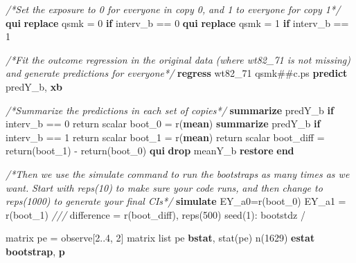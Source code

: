 \documentclass[
  10pt,
]{book}
\newenvironment{Shaded}{\begin{snugshade}}{\end{snugshade}}
\newcommand{\CommentTok}[1]{\textcolor[rgb]{0.56,0.35,0.01}{\textit{#1}}}
\newcommand{\DecValTok}[1]{\textcolor[rgb]{0.00,0.00,0.81}{#1}}
\newcommand{\FunctionTok}[1]{\textcolor[rgb]{0.00,0.00,0.00}{#1}}
\newcommand{\KeywordTok}[1]{\textcolor[rgb]{0.13,0.29,0.53}{\textbf{#1}}}
\newcommand{\NormalTok}[1]{#1}
\newcommand{\OtherTok}[1]{\textcolor[rgb]{0.56,0.35,0.01}{#1}}
\begin{document}
\begin{Shaded}
\begin{Highlighting}[]
\CommentTok{/*Set the exposure to 0 for everyone in copy 0, }
\CommentTok{and 1 to everyone for copy 1*/}
\KeywordTok{qui} \KeywordTok{replace}\NormalTok{ qsmk = 0 }\KeywordTok{if}\NormalTok{ interv\_b == 0}
\KeywordTok{qui} \KeywordTok{replace}\NormalTok{ qsmk = 1 }\KeywordTok{if}\NormalTok{ interv\_b == 1}

\CommentTok{/*Fit the outcome regression in the original data }
\CommentTok{(where wt82\_71 is not missing) and }
\CommentTok{generate predictions for everyone*/}
\KeywordTok{regress}\NormalTok{ wt82\_71 qsmk\#\#c.ps}
\KeywordTok{predict}\NormalTok{ predY\_b, }\KeywordTok{xb}

\CommentTok{/*Summarize the predictions in each set of copies*/}
\KeywordTok{summarize}\NormalTok{ predY\_b }\KeywordTok{if}\NormalTok{ interv\_b == 0}
\FunctionTok{return} \FunctionTok{scalar}\NormalTok{ boot\_0 = }\FunctionTok{r}\NormalTok{(}\KeywordTok{mean}\NormalTok{)}
\KeywordTok{summarize}\NormalTok{ predY\_b }\KeywordTok{if}\NormalTok{ interv\_b == 1}
\FunctionTok{return} \FunctionTok{scalar}\NormalTok{ boot\_1 = }\FunctionTok{r}\NormalTok{(}\KeywordTok{mean}\NormalTok{)}
\FunctionTok{return} \FunctionTok{scalar}\NormalTok{ boot\_diff = }\FunctionTok{return}\NormalTok{(boot\_1) {-} }\FunctionTok{return}\NormalTok{(boot\_0)}
\KeywordTok{qui} \KeywordTok{drop}\NormalTok{ meanY\_b}
\KeywordTok{restore}
\KeywordTok{end}

\CommentTok{/*Then we use the \textasciigrave{}simulate\textasciigrave{} command to run the bootstraps }
\CommentTok{as many times as we want.}
\CommentTok{Start with reps(10) to make sure your code runs, }
\CommentTok{and then change to reps(1000) to generate your final CIs*/}
\KeywordTok{simulate}\NormalTok{ EY\_a0=}\FunctionTok{r}\NormalTok{(boot\_0) EY\_a1 = }\FunctionTok{r}\NormalTok{(boot\_1) }\CommentTok{///}
\NormalTok{  difference = }\FunctionTok{r}\NormalTok{(boot\_diff), reps(500) }\DecValTok{seed}\NormalTok{(1): bootstdz /}

\FunctionTok{matrix}\NormalTok{ pe = observe[2..4, 2]\textquotesingle{}}
\FunctionTok{matrix} \OtherTok{list}\NormalTok{ pe}
\KeywordTok{bstat}\NormalTok{, stat(pe) n(1629) }
\KeywordTok{estat} \KeywordTok{bootstrap}\NormalTok{, }\KeywordTok{p}
\end{Highlighting}
\end{Shaded}
\end{document}
